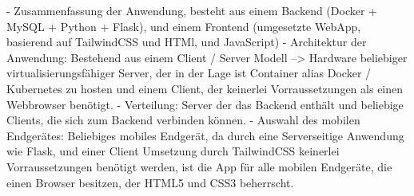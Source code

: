 - Zusammenfassung der Anwendung, besteht aus einem Backend (Docker + MySQL + Python + Flask), und einem Frontend (umgesetzte WebApp, basierend auf TailwindCSS und HTMl, und JavaScript)
- Architektur der Anwendung: Bestehend aus einem Client / Server Modell --> Hardware beliebiger virtualisierungsfähiger Server, der in der Lage ist Container alias Docker / Kubernetes  zu hosten und einem Client, der keinerlei Vorraussetzungen als einen Webbrowser benötigt.
- Verteilung: Server der das Backend enthält und beliebige Clients, die sich zum Backend verbinden können.
- Auswahl des mobilen Endgerätes: Beliebiges mobiles Endgerät, da durch eine Serverseitige Anwendung wie Flask, und einer Client Umsetzung durch TailwindCSS keinerlei Vorraussetzungen benötigt werden, ist die App für alle mobilen Endgeräte, die einen Browser besitzen, der HTML5 und CSS3 beherrscht.